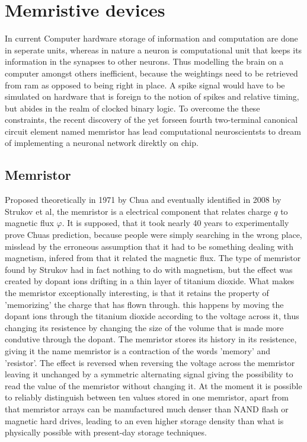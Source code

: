 \documentclass{SeminarV2}
\begin{document}
\section{Memristive devices}
In current Computer hardware storage of information and computation are done in seperate units, whereas in nature a neuron is computational unit that keeps its information in the synapses to other neurons. Thus modelling the brain on a computer amongst others inefficient, because the weightings need to be retrieved from ram as opposed to being right in place. A spike signal would have to be simulated on hardware that is foreign to the notion of spikes and relative timing, but abides in the realm of clocked binary logic. To overcome the these constraints, the recent discovery of the yet forseen \cite{chua_memristor-missing_1971} fourth two-terminal canonical circuit element named memristor has lead computational neuroscientsts to dream of implementing a neuronal network direktly on chip.

\subsection{Memristor}
Proposed theoretically in 1971 by Chua \cite{chua_memristor-missing_1971} and eventually identified in 2008 by Strukov et al, the memristor is a electrical component that relates charge $q$ to magnetic flux $\varphi$. It is supposed, that it took nearly 40 years to experimentally prove Chuas prediction, because people were simply searching in the wrong place, misslead by the erroneous assumption that it had to be something dealing with magnetism, infered from that it related the magnetic flux.
The type of memristor found by Strukov had in fact nothing to do with magnetism, but the effect was created by dopant ions drifting in a thin layer of titanium dioxide.
What makes the memristor exceptionally interesting, is that it retains the property of 'memorizing' the charge that has flown through. this happens by moving the dopant ions through the titanium dioxide according to the voltage across it, thus changing its resistence by changing the size of the volume that is made more condutive through the dopant. The memristor stores its history in its resistence, giving it the name memristor is a contraction of the words 'memory' and 'resistor'.
The effect is reversed when reversing the voltage across the memristor leaving it unchanged by a symmetric alternating signal giving the possibility to read the value of the memristor without changing it.
At the moment it is possible to reliably distinguish between ten values stored in one memristor, apart from that memristor arrays can be manufactured much denser than  NAND flash or magnetic hard drives, leading to an even higher storage density than what is physically possible with present-day storage techniques.
\end{document}
